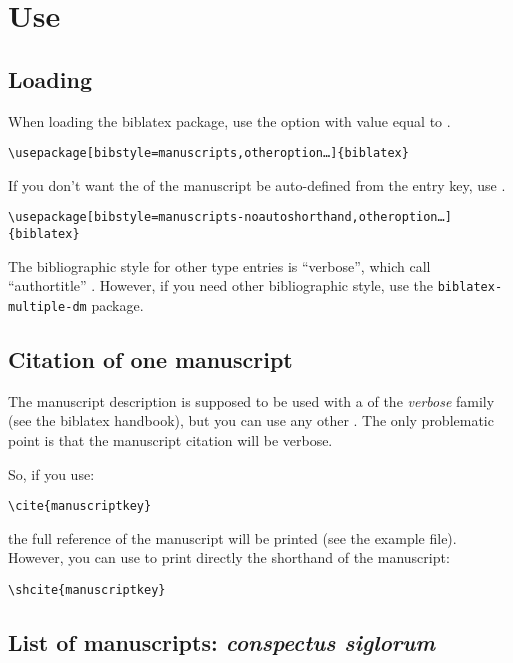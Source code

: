 \documentclass{ltxdockit}[2011/03/25]
\newcommand{\biblatex}{biblatex\xspace}
\begin{document}
\section{Use}
\subsection{Loading}

When loading the \biblatex package, use the option  with value equal to .

\begin{verbatim}
\usepackage[bibstyle=manuscripts,otheroption…]{biblatex}
\end{verbatim}

\label{noautoshorthand}If you don't want the  of the manuscript be auto-defined from the entry key, use .

\begin{verbatim}
\usepackage[bibstyle=manuscripts-noautoshorthand,otheroption…]{biblatex}
\end{verbatim}

The bibliographic style for other type entries is \enquote{verbose}, which call \enquote{authortitle} . However, if you need other bibliographic style, use the \verb+biblatex-multiple-dm+ package.

\subsection{Citation of one manuscript}

The manuscript description is supposed to be used with a  of the \emph{verbose} family (see the \biblatex handbook), but you can use any other . The only problematic point is that the manuscript citation will be verbose.

So, if you use:
\begin{verbatim}
\cite{manuscriptkey}
\end{verbatim}

the full reference of the manuscript will be printed (see the example file). However, you can use  to print directly the shorthand of the manuscript:

\begin{verbatim}
\shcite{manuscriptkey}
\end{verbatim}

\subsection{List of manuscripts: \emph{conspectus siglorum}}
\end{document}
